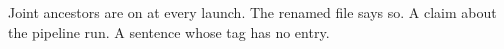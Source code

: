 Joint ancestors are on at every launch. %
The renamed file says so. %
A claim about the pipeline run. %
A sentence whose tag has no entry. %
